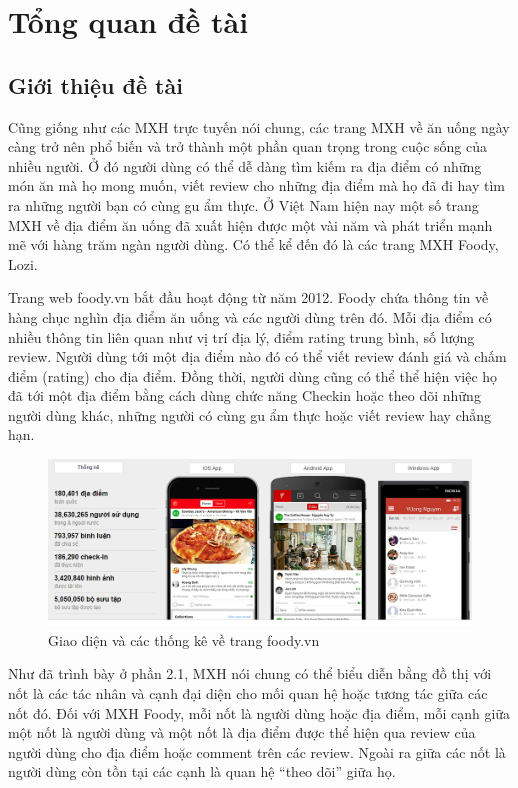 \documentclass[12pt]{extarticle}
\begin{document}
	\section{Tổng quan đề tài}
		\subsection{Giới thiệu đề tài}
			\par Cũng giống như các MXH trực tuyến nói chung, các trang MXH về ăn uống ngày càng trở nên phổ biến và trở thành một phần quan trọng trong cuộc sống của nhiều người. Ở đó người dùng có thể dễ dàng tìm kiếm ra địa điểm có những món ăn mà họ mong muốn, viết review cho những địa điểm mà họ đã đi hay tìm ra những người bạn có cùng gu ẩm thực. Ở Việt Nam hiện nay một số trang MXH về địa điểm ăn uống đã xuất hiện được một vài năm và phát triển mạnh mẽ với hàng trăm ngàn người dùng. Có thể kể đến đó là các trang MXH Foody, Lozi.
			\par Trang web foody.vn bắt đầu hoạt động từ năm 2012. Foody chứa thông tin về hàng chục nghìn địa điểm ăn uống và các người dùng trên đó. Mỗi địa điểm có nhiều thông tin liên quan như vị trí địa lý, điểm rating trung bình, số lượng review. Người dùng tới một địa điểm nào đó có thể viết review đánh giá và chấm điểm (rating) cho địa điểm. Đồng thời, người dùng cũng có thể thể hiện việc họ đã tới một địa điểm bằng cách dùng chức năng Checkin hoặc theo dõi những người dùng khác, những người có cùng gu ẩm thực hoặc viết review hay chẳng hạn.

			\begin{figure}[h!]
				\includegraphics[width=\linewidth]{foody}
				\caption{Giao diện và các thống kê về trang foody.vn}
				\label{fig:foody}
			\end{figure}

			\par Như đã trình bày ở phần 2.1, MXH nói chung có thể biểu diễn bằng đồ thị với nốt là các tác nhân và cạnh đại diện cho mối quan hệ hoặc tương tác giữa các nốt đó. Đối với MXH Foody, mỗi nốt là người dùng hoặc địa điểm, mỗi cạnh giữa một nốt là người dùng và một nốt là địa điểm được thể hiện qua review của người dùng cho địa điểm hoặc comment trên các review. Ngoài ra giữa các nốt là người dùng còn tồn tại các cạnh là quan hệ “theo dõi” giữa họ.
\end{document}
